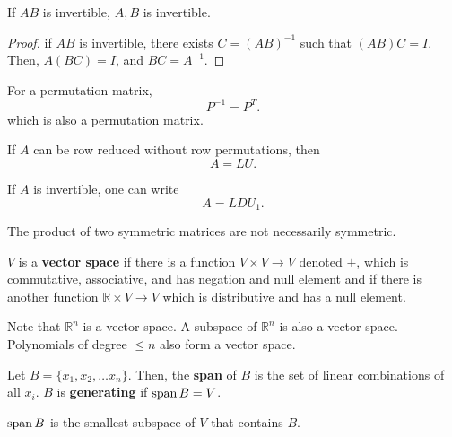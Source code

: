 
\begin{theorem}
	If \( AB \) is invertible, \( A,B \) is invertible.
\end{theorem}
\begin{proof}
	if \( AB \) is invertible, there exists \( C = (AB)^{-1}  \) such that \( (AB)C = I \). Then, \( A(BC) = I \), and \( BC = A^{-1}  \).
\end{proof}

\begin{prop}
	For a permutation matrix,\[
		P^{-1}  = P^{T} 
	.\] which is also a permutation matrix.
\end{prop}

\begin{prop}
	If \( A \) can be row reduced without row permutations, then \[
		A = LU
	.\] 
\end{prop}

\begin{prop}
	If \( A \) is invertible, one can write \[
		A = LDU_{1}
	.\]  
\end{prop}

\begin{note}
	The product of two symmetric matrices are not necessarily symmetric.
\end{note}

\begin{definition}
	\( V \) is a \textbf{vector space} if there is a function \( V \times V \to V \) denoted \( + \), which is commutative, associative, and has negation and null element and if there is another function \( \mathbb{R} \times V \to V \) which is distributive and has a null element.
\end{definition}

Note that \( \mathbb{R}^{n}  \) is a vector space. A subspace of \( \mathbb{R}^{n}  \) is also a vector space. Polynomials of degree \( \le n \) also form a vector space.

\begin{definition}
	Let \( B = \{x_{1},x_{2},\ldots x_n\}   \). Then, the \textbf{span} of \( B \) is the set of linear combinations of all \( x_i \). \( B \) is \textbf{generating} if \( \operatorname{span} B = V \).
\end{definition}

\begin{note}
	\( \operatorname{span} B \) is the smallest subspace of \( V \) that contains \( B \).
\end{note}


